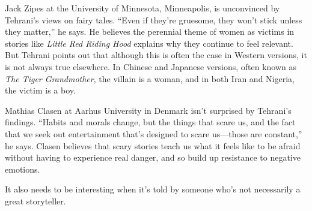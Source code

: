 \documentclass{exam-zh}
\begin{document}
Jack Zipes at the University of Minnesota, Minneapolis, is unconvinced by Tehrani's views on fairy tales. ``Even if they're gruesome, they won't stick unless they matter,'' he says. He believes the perennial theme of women as victims in stories like \textit{Little Red Riding Hood} explains why they continue to feel relevant. But Tehrani points out that although this is often the case in Western versions, it is not always true elsewhere. In Chinese and Japanese versions, often known as \textit{The Tiger Grandmother}, the villain is a woman, and in both Iran and Nigeria, the victim is a boy.

Mathias Clasen at Aarhus University in Denmark isn't surprised by Tehrani's findings. ``Habits and morals change, but the things that scare us, and the fact that we seek out entertainment that's designed to scare us—those are constant,'' he says. Clasen believes that scary stories teach us what it feels like to be afraid without having to experience real danger, and so build up resistance to negative emotions.

\begin{choices}
\item It also needs to be interesting when it's told by someone who's not necessarily a great storyteller.
\end{choices}
\end{document}
